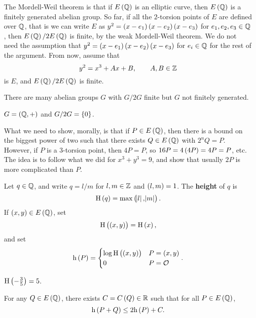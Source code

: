 
The Mordell-Weil theorem is that if $ E\br{\QQ} $ is an elliptic curve, then $ E\br{\QQ} $ is a finitely generated abelian group. So far, if all the $ 2 $-torsion points of $ E $ are defined over $ \mathbb{Q} $, that is we can write $ E $ as $ y^2 = \br{x - e_1}\br{x - e_2}\br{x - e_3} $ for $ e_1, e_2, e_3 \in \mathbb{Q} $, then $ E\br{\QQ} / 2E\br{\QQ} $ is finite, by the weak Mordell-Weil theorem. We do not need the assumption that $ y^2 = \br{x - e_1}\br{x - e_2}\br{x - e_3} $ for $ e_i \in \mathbb{Q} $ for the rest of the argument. From now, assume that
$$ y^2 = x^3 + Ax + B, \qquad A, B \in \mathbb{Z} $$
is $ E $, and $ E\br{\QQ} / 2E\br{\QQ} $ is finite.

\begin{note*}
There are many abelian groups $ G $ with $ G / 2G $ finite but $ G $ not finitely generated.
\end{note*}

\begin{example*}
$ G = \br{\QQ, +} $ and $ G / 2G = \cbr{0} $.
\end{example*}

What we need to show, morally, is that if $ P \in E\br{\QQ} $, then there is a bound on the biggest power of two such that there exists $ Q \in E\br{\QQ} $ with $ 2^nQ = P $. However, if $ P $ is a $ 3 $-torsion point, then $ 4P = P $, so $ 16P = 4\br{4P} = 4P = P $, etc. The idea is to follow what we did for $ x^3 + y^3 = 9 $, and show that usually $ 2P $ is more complicated than $ P $.

\begin{definition}
Let $ q \in \mathbb{Q} $, and write $ q = l / m $ for $ l, m \in \mathbb{Z} $ and $ \br{l, m} = 1 $. The \textbf{height} of $ q $ is
$$ \H\br{q} = \max\br{\abs{l}, \abs{m}}. $$
If $ \br{x, y} \in E\br{\QQ} $, set
$$ \H\br{\br{x, y}} = \H\br{x}, $$
and set
$$ \h\br{P} =
\begin{cases}
\log \H\br{\br{x, y}} & P = \br{x, y} \\
0 & P = \OOO
\end{cases}.
$$
\end{definition}

\begin{example*}
$ \H\br{-\tfrac{3}{5}} = 5 $.
\end{example*}

\begin{lemma}
For any $ Q \in E\br{\QQ} $, there exists $ C = C\br{Q} \in \RR $ such that for all $ P \in E\br{\QQ} $,
$$ \h\br{P + Q} \le 2\h\br{P} + C. $$
\end{lemma}


